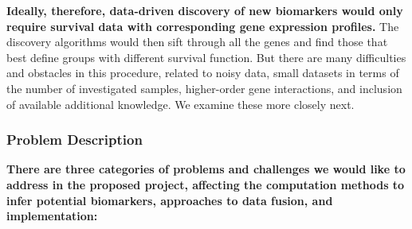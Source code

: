 \documentclass[11pt,a4paper]{article}
\renewcommand{\bold}{\textbf}
\begin{document}
\bold{Ideally, therefore, data-driven discovery of new biomarkers would only require survival data with corresponding gene expression profiles.} The discovery algorithms would then sift through all the genes and find those that best define groups with different survival function. But there are many difficulties and obstacles in this procedure, related to noisy data, small datasets in terms of the number of investigated samples, higher-order gene interactions, and inclusion of available additional knowledge. We examine these more closely next.

\subsubsection*{Problem Description}

\bold{There are three categories of problems and challenges we would like to address in the proposed project, affecting the computation methods to infer potential biomarkers, approaches to data fusion, and implementation:}
\end{document}

